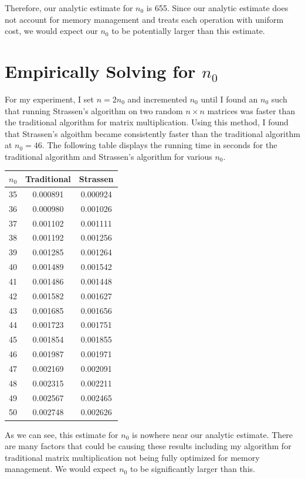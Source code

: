 \documentclass{article}
\begin{document}
Therefore, our analytic estimate for $n_0$ is 655. Since our analytic estimate does not account for memory management and treats each operation with uniform cost, we would expect our $n_0$ to be potentially larger than this estimate.

\pagebreak
\section{Empirically Solving for $n_0$}
For my experiment, I set $n = 2n_0$ and incremented $n_0$ until I found an $n_0$ such that running Strassen's algorithm on two random $n \times n$ matrices was faster than the traditional algorithm for matrix multiplication. Using this method, I found that Strassen's algoithm became consistently faster than the traditional algorithm at $n_0 = 46$. The following table displays the running time in seconds for the traditional algorithm and Strassen's algorithm for various $n_0$.

\begin{center}
    \begin{tabular}{ |c|c|c| } 
    \hline
    $n_0$ & Traditional & Strassen\\
    \hline
    35   &   0.000891    &    0.000924\\
    36   &   0.000980    &    0.001026\\
    37   &   0.001102    &    0.001111\\
    38   &   0.001192    &    0.001256\\
    39   &   0.001285    &    0.001264\\
    40   &   0.001489    &    0.001542\\
    41   &   0.001486    &    0.001448\\
    42   &   0.001582    &    0.001627\\
    43   &   0.001685    &    0.001656\\
    44   &   0.001723    &    0.001751\\
    45   &   0.001854    &    0.001855\\
    46   &   0.001987    &    0.001971\\
    47   &   0.002169    &    0.002091\\
    48   &   0.002315    &    0.002211\\
    49   &   0.002567    &    0.002465\\
    50   &   0.002748    &    0.002626\\
    \hline
    
    \end{tabular}
    \end{center}
As we can see, this estimate for $n_0$ is nowhere near our analytic estimate. There are many factors that could be causing these results including my algorithm for traditional matrix multiplication not being fully optimized for memory management. We would expect $n_0$ to be significantly larger than this.
\pagebreak
\end{document}
